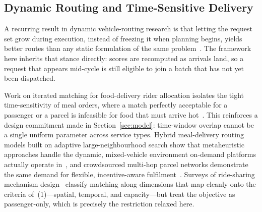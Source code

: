 \documentclass[conference]{IEEEtran}
\begin{document}
\subsection{Dynamic Routing and Time-Sensitive Delivery}
A recurring result in dynamic vehicle-routing research is that letting the
request set grow during execution, instead of freezing it when planning
begins, yields better routes than any static formulation of the same
problem~\cite{pillac2013}. The framework here inherits that stance directly:
scores are recomputed as arrivals land, so a request that appears mid-cycle
is still eligible to join a batch that has not yet been dispatched.

Work on iterated matching for food-delivery rider allocation isolates the
tight time-sensitivity of meal orders, where a match perfectly acceptable
for a passenger or a parcel is infeasible for food that must arrive
hot~\cite{chen2022}. This reinforces a design commitment made in
Section~\ref{sec:model}: time-window overlap cannot be a single uniform
parameter across service types. Hybrid meal-delivery routing models built
on adaptive large-neighbourhood search show that metaheuristic approaches
handle the dynamic, mixed-vehicle environment on-demand platforms actually
operate in~\cite{liu2025}, and crowdsourced multi-hop parcel networks
demonstrate the same demand for flexible, incentive-aware
fulfilment~\cite{hong2019}. Surveys of ride-sharing mechanism
design~\cite{furuhata2013} classify matching along dimensions that map
cleanly onto the criteria of~(1)---spatial, temporal, and capacity---but
treat the objective as passenger-only, which is precisely the restriction
relaxed here.
\end{document}
